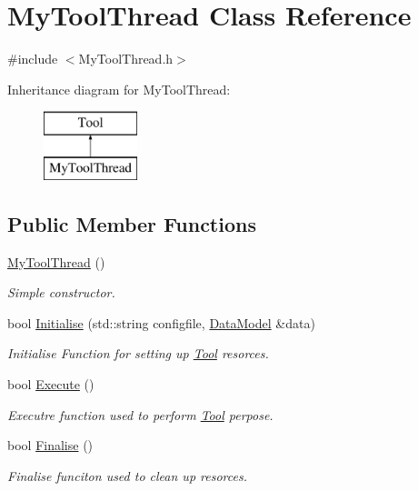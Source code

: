 \hypertarget{classMyToolThread}{\section{My\-Tool\-Thread Class Reference}
\label{classMyToolThread}
}


{\ttfamily \#include $<$My\-Tool\-Thread.\-h$>$}

Inheritance diagram for My\-Tool\-Thread\-:\begin{figure}[H]
\begin{center}
\leavevmode
\includegraphics[height=2.000000cm]{classMyToolThread}
\end{center}
\end{figure}
\subsection*{Public Member Functions}
\begin{DoxyCompactItemize}
\item 
\hypertarget{classMyToolThread_a66c6fc304a8d62436281598d988dd845}{\hyperlink{classMyToolThread_a66c6fc304a8d62436281598d988dd845}{My\-Tool\-Thread} ()}\label{classMyToolThread_a66c6fc304a8d62436281598d988dd845}

\begin{DoxyCompactList}\small\item\em Simple constructor. \end{DoxyCompactList}\item 
bool \hyperlink{classMyToolThread_adc7ab1ab74fc1564f07e52e63383d679}{Initialise} (std\-::string configfile, \hyperlink{classDataModel}{Data\-Model} \&data)
\begin{DoxyCompactList}\small\item\em Initialise Function for setting up \hyperlink{classTool}{Tool} resorces. \end{DoxyCompactList}\item 
\hypertarget{classMyToolThread_a9b582cd202d5578682d57d973988df3c}{bool \hyperlink{classMyToolThread_a9b582cd202d5578682d57d973988df3c}{Execute} ()}\label{classMyToolThread_a9b582cd202d5578682d57d973988df3c}

\begin{DoxyCompactList}\small\item\em Executre function used to perform \hyperlink{classTool}{Tool} perpose. \end{DoxyCompactList}\item 
\hypertarget{classMyToolThread_aa51e385684efcb19f1c039b96653070e}{bool \hyperlink{classMyToolThread_aa51e385684efcb19f1c039b96653070e}{Finalise} ()}\label{classMyToolThread_aa51e385684efcb19f1c039b96653070e}

\begin{DoxyCompactList}\small\item\em Finalise funciton used to clean up resorces. \end{DoxyCompactList}\end{DoxyCompactItemize}
